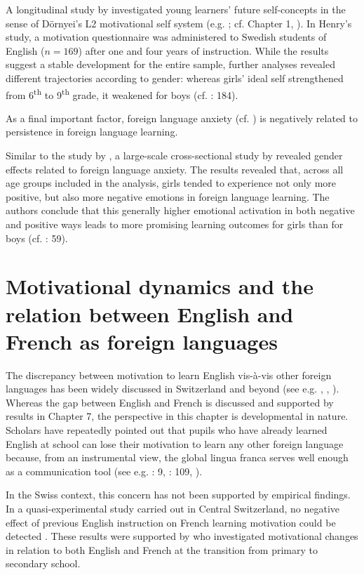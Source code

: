 \documentclass[output=paper]{langsci/langscibook}
\begin{document}
A longitudinal study by \citet{Henry2009} investigated young learners’ future self-concepts in the sense of Dörnyei's L2 motivational self system (e.g. \citealt{Doernyei2009}; cf. Chapter 1, ). In Henry’s study, a motivation questionnaire was administered to Swedish students of English ($n=169$) after one and four years of instruction. While the results suggest a stable development for the entire sample, further analyses revealed different trajectories according to gender: whereas girls’ ideal self strengthened from 6\textsuperscript{th} to 9\textsuperscript{th} grade, it weakened for boys (cf. \citealt{Henry2009}: 184). 

As a final important factor, foreign language anxiety (cf. \citealt{MacIntyre1999}) is negatively related to persistence in foreign language learning.

Similar to the study by \citet{Henry2009}, a large-scale cross-sectional study by \citet{DewaeleEtAl2016} revealed gender effects related to foreign language anxiety. The results revealed that, across all age groups included in the analysis, girls tended to experience not only more positive, but also more negative emotions in foreign language learning. The authors conclude that this generally higher emotional activation in both negative and positive ways leads to more promising learning outcomes for girls than for boys (cf. \citealt{DewaeleEtAl2016}: 59).

\section{Motivational dynamics and the relation between English and French as foreign languages}

The discrepancy between motivation to learn English vis-à-vis other foreign languages has been widely discussed in Switzerland and beyond (see e.g. \citealt{BuylHousen2014}, \citealt{Ushioda2017}, \citealt{Busse2017}). Whereas the gap between English and French is discussed and supported by results in Chapter 7, the perspective in this chapter is developmental in nature. Scholars have repeatedly pointed out that pupils who have already learned English at school can lose their motivation to learn any other foreign language because, from an instrumental view, the global lingua franca serves well enough as a communication tool (see e.g. \citealt{Hufeisen2003}: 9, \citealt{MeissnerEtAl2008}: 109, \citealt{Ushioda2017}).

In the Swiss context, this concern has not been supported by empirical findings. In a quasi-experimental study carried out in Central Switzerland, no negative effect of previous English instruction on French learning motivation could be detected \citep{Heinzmann2010}. These results were supported by \citet[176]{BruehwilerLePapeRacine2017} who investigated motivational changes in relation to both English and French at the transition from primary to secondary school. 
\end{document}
